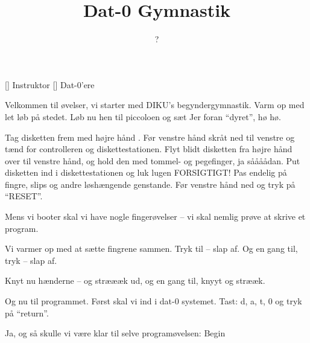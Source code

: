 \documentclass[a4paper,11pt]{article}
\title{Dat-0 Gymnastik}
\author{?}
\begin{document}
\maketitle

\begin{roles}
[] Instruktor
[] Dat-0'ere
\end{roles}



\begin{sketch}


 Velkommen til øvelser, vi starter med DIKU's begyndergymnastik. Varm op med let løb på stedet. Løb nu hen til piccoloen og sæt Jer foran ``dyret'', hø hø.

 Tag disketten frem med højre hånd . Før venstre hånd skråt ned til venstre og tænd for controlleren og diskettestationen. Flyt blidt disketten fra højre hånd over til venstre hånd, og hold den med tommel- og pegefinger, ja såååådan. Put disketten ind i diskettestationen og luk lugen FORSIGTIGT! Pas endelig på fingre, slips og andre løshængende genstande. Før venstre hånd ned og tryk på ``RESET''.

 Mens vi booter skal vi have nogle fingerøvelser -- vi skal nemlig prøve at skrive et program.

 Vi varmer op med at sætte fingrene sammen. Tryk til -- slap af. Og en gang til, tryk -- slap af. 

 Knyt nu hænderne -- og stræææk ud, og en gang til, knyyt og strææk.

 Og nu til programmet. Først skal vi ind i dat-0 systemet. Tast: d, a, t, 0 og tryk på ``return''.

 Ja, og så skulle vi være klar til selve programøvelsen: Begin 


\end{sketch}
\end{document}
